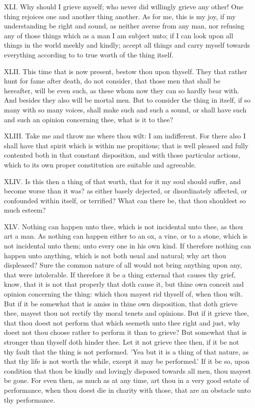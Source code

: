 XLI. Why should I grieve myself; who never did willingly grieve any
other! One thing rejoices one and another thing another. As for me, this
is my joy, if my understanding be right and sound, as neither averse from
any man, nor refusing any of those things which as a man I am subject
unto; if I can look upon all things in the world meekly and kindly; accept
all things and carry myself towards everything according to to true worth
of the thing itself.

XLII. This time that is now present, bestow thou upon thyself. They that
rather hunt for fame after death, do not consider, that those men that
shall be hereafter, will be even such, as these whom now they can so
hardly bear with. And besides they also will be mortal men. But to
consider the thing in itself, if so many with so many voices, shall make
such and such a sound, or shall have such and such an opinion concerning
thee, what is it to thee?

XLIII. Take me and throw me where thou wilt: I am indifferent. For there
also I shall have that spirit which is within me propitious; that is well
pleased and fully contented both in that constant disposition, and with
those particular actions, which to its own proper constitution are
suitable and agreeable.

XLIV. Is this then a thing of that worth, that for it my soul should
suffer, and become worse than it was? as either basely dejected, or
disordinately affected, or confounded within itself, or terrified? What
can there be, that thou shouldest so much esteem?

XLV. Nothing can happen unto thee, which is not incidental unto thee, as
thou art a man. As nothing can happen either to an ox, a vine, or to a
stone, which is not incidental unto them; unto every one in his own kind.
If therefore nothing can happen unto anything, which is not both usual and
natural; why art thou displeased? Sure the common nature of all would not
bring anything upon any, that were intolerable. If therefore it be a thing
external that causes thy grief, know, that it is not that properly that
doth cause it, but thine own conceit and opinion concerning the thing:
which thou mayest rid thyself of, when thou wilt. But if it be somewhat
that is amiss in thine own disposition, that doth grieve thee, mayest thou
not rectify thy moral tenets and opinions. But if it grieve thee, that
thou doest not perform that which seemeth unto thee right and just, why
doest not thou choose rather to perform it than to grieve? But somewhat
that is stronger than thyself doth hinder thee. Let it not grieve thee
then, if it be not thy fault that the thing is not performed. 'Yea but it
is a thing of that nature, as that thy life is not worth the while, except
it may be performed.' If it be so, upon condition that thou be kindly and
lovingly disposed towards all men, thou mayest be gone. For even then, as
much as at any time, art thou in a very good estate of performance, when
thou doest die in charity with those, that are an obstacle unto thy
performance.

